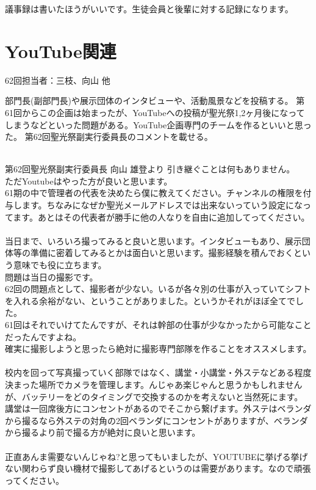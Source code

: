 \documentclass[a4paper]{ltjsreport}
\begin{document}
議事録は書いたほうがいいです。生徒会員と後輩に対する記録になります。

\section{YouTube関連}
62回担当者：三枝、向山 他\vspace{3mm}

部門長(副部門長)や展示団体のインタビューや、活動風景などを投稿する。
第61回からこの企画は始まったが、YouTubeへの投稿が聖光祭1,2ヶ月後になってしまうなどといった問題がある。YouTube企画専門のチームを作るといいと思った。
第62回聖光祭副実行委員長のコメントを載せる。
\\
\\
\begin{itembox}[l]{第62回聖光祭副実行委員長 向山 雄登より}
  引き継ぐことは何もありません。\\
  ただYoutubeはやった方が良いと思います。\\
  61期の中で管理者の代表を決めたら僕に教えてください。チャンネルの権限を付与します。ちなみになぜか聖光メールアドレスでは出来ないっていう設定になってます。あとはその代表者が勝手に他の人なりを自由に追加してってください。\\\\
  当日まで、いろいろ撮ってみると良いと思います。インタビューもあり、展示団体等の準備に密着してみるとかは面白いと思います。撮影経験を積んでおくという意味でも役に立ちます。\\
  問題は当日の撮影です。\\
  62回の問題点として、撮影者が少ない。いるが各々別の仕事が入っていてシフトを入れる余裕がない、ということがありました。というかそれがほぼ全てでした。\\
  61回はそれでいけてたんですが、それは幹部の仕事が少なかったから可能なことだったんですよね。\\
  確実に撮影しようと思ったら絶対に撮影専門部隊を作ることをオススメします。\\\\
  校内を回って写真撮っていく部隊ではなく、講堂・小講堂・外ステなどある程度決まった場所でカメラを管理します。んじゃあ楽じゃんと思うかもしれませんが、バッテリーをどのタイミングで交換するのかを考えないと当然死にます。\\
  講堂は一回席後方にコンセントがあるのでそこから繋げます。外ステはベランダから撮るなら外ステの対角の2回ベランダにコンセントがありますが、ベランダから撮るより前で撮る方が絶対に良いと思います。\\\\
  正直あんま需要ないんじゃね?と思ってもいましたが、YOUTUBEに挙げる挙げない関わらず良い機材で撮影してあげるというのは需要があります。なので頑張ってください。
\end{itembox}
\end{document}
